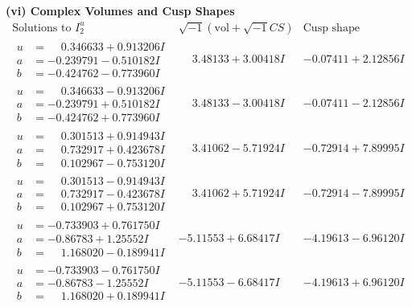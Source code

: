 \documentclass[1p]{elsarticle_modified}
\theoremstyle{definition}
\newcommand{\I}{\sqrt{-1}}
\begin{document}
\newpage\flushleft \textbf{(vi) Complex Volumes and Cusp Shapes}
$$\begin{array}{c|c|c}  
\text{Solutions to }I^u_{2}& \I (\text{vol} + \sqrt{-1}CS) & \text{Cusp shape}\\
 \hline 
\begin{aligned}
u &= \phantom{-}0.346633 + 0.913206 I \\
a &= -0.239791 - 0.510182 I \\
b &= -0.424762 - 0.773960 I\end{aligned}
 & \phantom{-}3.48133 + 3.00418 I & -0.07411 + 2.12856 I \\ \hline\begin{aligned}
u &= \phantom{-}0.346633 - 0.913206 I \\
a &= -0.239791 + 0.510182 I \\
b &= -0.424762 + 0.773960 I\end{aligned}
 & \phantom{-}3.48133 - 3.00418 I & -0.07411 - 2.12856 I \\ \hline\begin{aligned}
u &= \phantom{-}0.301513 + 0.914943 I \\
a &= \phantom{-}0.732917 + 0.423678 I \\
b &= \phantom{-}0.102967 - 0.753120 I\end{aligned}
 & \phantom{-}3.41062 - 5.71924 I & -0.72914 + 7.89995 I \\ \hline\begin{aligned}
u &= \phantom{-}0.301513 - 0.914943 I \\
a &= \phantom{-}0.732917 - 0.423678 I \\
b &= \phantom{-}0.102967 + 0.753120 I\end{aligned}
 & \phantom{-}3.41062 + 5.71924 I & -0.72914 - 7.89995 I \\ \hline\begin{aligned}
u &= -0.733903 + 0.761750 I \\
a &= -0.86783 + 1.25552 I \\
b &= \phantom{-}1.168020 - 0.189941 I\end{aligned}
 & -5.11553 + 6.68417 I & -4.19613 - 6.96120 I \\ \hline\begin{aligned}
u &= -0.733903 - 0.761750 I \\
a &= -0.86783 - 1.25552 I \\
b &= \phantom{-}1.168020 + 0.189941 I\end{aligned}
 & -5.11553 - 6.68417 I & -4.19613 + 6.96120 I \\ \hline\begin{aligned}

\end{aligned}
\end{array}$$
\end{document}

